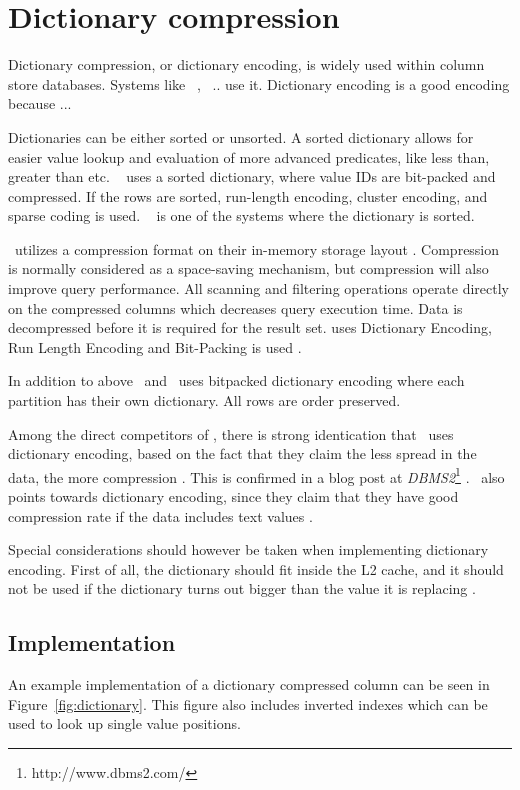 \section{Dictionary compression}
\label{sec:Dictionary compression}
Dictionary compression, or dictionary encoding, is widely used within column store databases. Systems like \ibm~\cite{Raman2013-em}, \saph~\cite{Farber2012-vh}.. use it. Dictionary encoding is a good encoding because ... \ea~\cite{Faust2015-ke}

Dictionaries can be either sorted or unsorted. A sorted dictionary allows for easier value lookup and evaluation of more advanced predicates, like less than, greater than etc. \saph~\cite{Farber2012-vh} uses a sorted dictionary, where value IDs are bit-packed and compressed. If the rows are sorted, run-length encoding, cluster encoding, and sparse coding is used. \sapnw~\cite{Lemke2010-is} is one of the systems where the dictionary is sorted.

\oracle~utilizes a compression format on their in-memory storage layout \cite{Oracle2015-fs}. Compression is normally considered as a space-saving mechanism, but compression will also improve query performance. All scanning and filtering operations operate directly on the compressed columns which decreases query execution time. Data is decompressed before it is required for the result set. \oracle uses Dictionary Encoding, Run Length Encoding and Bit-Packing is used \cite{Oracle2015-fs}. 

In addition to above \ibm~and \blink~uses bitpacked dictionary encoding where each partition has their own dictionary. All rows are order preserved.

Among the direct competitors of \genusSoftware, there is strong identication that \qlikview~uses dictionary encoding, based on the fact that they claim the less spread in the data, the more compression \cite{Qlik2011-ef}. This is confirmed in a blog post at \textit{DBMS2}\footnote{http://www.dbms2.com/} \cite{noauthor_undated-js}. \tableau~also points towards dictionary encoding, since they claim that they have good compression rate if the data includes text values \cite{Kamkolkar2015-iq}.

Special considerations should however be taken when implementing dictionary encoding. First of all, the dictionary should fit inside the L2 cache, and it should not be used if the dictionary turns out bigger than the value it is replacing \cite{Holloway2008-rr}. 

\subsection{Implementation}
\label{sub:Implementation}
An example implementation of a dictionary compressed column can be seen in Figure~\ref{fig:dictionary}. This figure also includes inverted indexes which can be used to look up single value positions.


